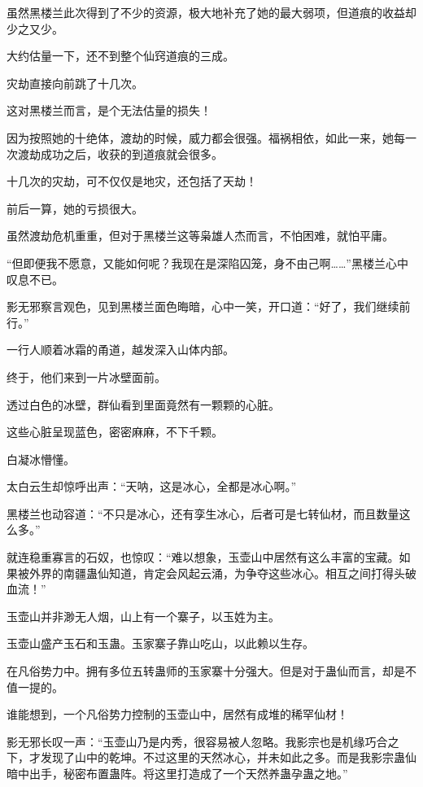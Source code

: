 
\begin{this_body}

虽然黑楼兰此次得到了不少的资源，极大地补充了她的最大弱项，但道痕的收益却少之又少。

大约估量一下，还不到整个仙窍道痕的三成。

灾劫直接向前跳了十几次。

这对黑楼兰而言，是个无法估量的损失！

因为按照她的十绝体，渡劫的时候，威力都会很强。福祸相依，如此一来，她每一次渡劫成功之后，收获的到道痕就会很多。

十几次的灾劫，可不仅仅是地灾，还包括了天劫！

前后一算，她的亏损很大。

虽然渡劫危机重重，但对于黑楼兰这等枭雄人杰而言，不怕困难，就怕平庸。

“但即便我不愿意，又能如何呢？我现在是深陷囚笼，身不由己啊……”黑楼兰心中叹息不已。

影无邪察言观色，见到黑楼兰面色晦暗，心中一笑，开口道：“好了，我们继续前行。”

一行人顺着冰霜的甬道，越发深入山体内部。

终于，他们来到一片冰壁面前。

透过白色的冰壁，群仙看到里面竟然有一颗颗的心脏。

这些心脏呈现蓝色，密密麻麻，不下千颗。

白凝冰懵懂。

太白云生却惊呼出声：“天呐，这是冰心，全都是冰心啊。”

黑楼兰也动容道：“不只是冰心，还有孪生冰心，后者可是七转仙材，而且数量这么多。”

就连稳重寡言的石奴，也惊叹：“难以想象，玉壶山中居然有这么丰富的宝藏。如果被外界的南疆蛊仙知道，肯定会风起云涌，为争夺这些冰心。相互之间打得头破血流！”

玉壶山并非渺无人烟，山上有一个寨子，以玉姓为主。

玉壶山盛产玉石和玉蛊。玉家寨子靠山吃山，以此赖以生存。

在凡俗势力中。拥有多位五转蛊师的玉家寨十分强大。但是对于蛊仙而言，却是不值一提的。

谁能想到，一个凡俗势力控制的玉壶山中，居然有成堆的稀罕仙材！

影无邪长叹一声：“玉壶山乃是内秀，很容易被人忽略。我影宗也是机缘巧合之下，才发现了山中的乾坤。不过这里的天然冰心，并未如此之多。而是我影宗蛊仙暗中出手，秘密布置蛊阵。将这里打造成了一个天然养蛊孕蛊之地。”


\end{this_body}
